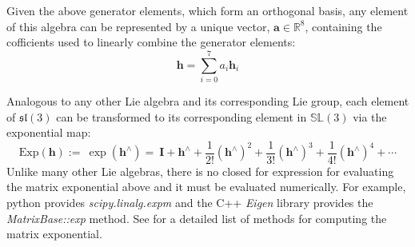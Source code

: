 Given the above generator elements, which form an orthogonal basis, any element of this algebra can be represented by a unique vector, \(\mathbf{a}\in\mathbb{R}^{8}\), containing the cofficients used to linearly combine the generator elements:
\[
    \mathbf{h}=\sum_{i=0}^{7}a_{i}\mathbf{h}_{i}
\]

Analogous to any other Lie algebra and its corresponding Lie group, each element of \(\mathfrak{sl}(3)\) can be transformed to its corresponding element in \(\mathbb{SL}(3)\) via the exponential map:
\[
    \text{Exp}(\mathbf{h}):=\
    \exp(\mathbf{h}^{\wedge})=\
    \mathbf{I}+\mathbf{h}^{\wedge}+\frac{1}{2!}(\mathbf{h}^{\wedge})^{2}+\frac{1}{3!}(\mathbf{h}^{\wedge})^{3}+\frac{1}{4!}(\mathbf{h}^{\wedge})^{4}+\cdots
\]
Unlike many other Lie algebras, there is no closed for expression for evaluating the matrix exponential above and it must be evaluated numerically. For example, python provides \emph{scipy.linalg.expm} and the C++ \emph{Eigen} library provides the \emph{MatrixBase::exp} method. See \cite{ways19_moler} for a detailed list of methods for computing the matrix exponential.

